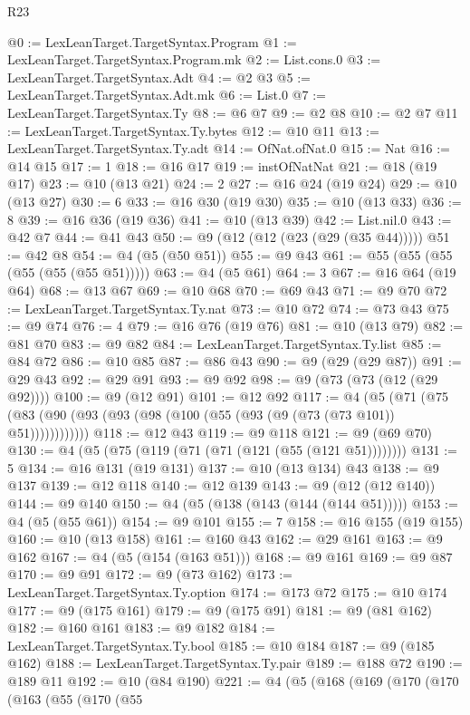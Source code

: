 \begin{lexlean}{R23}
\begin{coremodule}
@0 := LexLeanTarget.TargetSyntax.Program
@1 := LexLeanTarget.TargetSyntax.Program.mk
@2 := List.cons.{0}
@3 := LexLeanTarget.TargetSyntax.Adt
@4 := @2 @3
@5 := LexLeanTarget.TargetSyntax.Adt.mk
@6 := List.{0}
@7 := LexLeanTarget.TargetSyntax.Ty
@8 := @6 @7
@9 := @2 @8
@10 := @2 @7
@11 := LexLeanTarget.TargetSyntax.Ty.bytes
@12 := @10 @11
@13 := LexLeanTarget.TargetSyntax.Ty.adt
@14 := OfNat.ofNat.{0}
@15 := Nat
@16 := @14 @15
@17 := 1
@18 := @16 @17
@19 := instOfNatNat
@21 := @18 (@19 @17)
@23 := @10 (@13 @21)
@24 := 2
@27 := @16 @24 (@19 @24)
@29 := @10 (@13 @27)
@30 := 6
@33 := @16 @30 (@19 @30)
@35 := @10 (@13 @33)
@36 := 8
@39 := @16 @36 (@19 @36)
@41 := @10 (@13 @39)
@42 := List.nil.{0}
@43 := @42 @7
@44 := @41 @43
@50 := @9 (@12 (@12 (@23 (@29 (@35 @44)))))
@51 := @42 @8
@54 := @4 (@5 (@50 @51))
@55 := @9 @43
@61 := @55 (@55 (@55 (@55 (@55 (@55 @51)))))
@63 := @4 (@5 @61)
@64 := 3
@67 := @16 @64 (@19 @64)
@68 := @13 @67
@69 := @10 @68
@70 := @69 @43
@71 := @9 @70
@72 := LexLeanTarget.TargetSyntax.Ty.nat
@73 := @10 @72
@74 := @73 @43
@75 := @9 @74
@76 := 4
@79 := @16 @76 (@19 @76)
@81 := @10 (@13 @79)
@82 := @81 @70
@83 := @9 @82
@84 := LexLeanTarget.TargetSyntax.Ty.list
@85 := @84 @72
@86 := @10 @85
@87 := @86 @43
@90 := @9 (@29 (@29 @87))
@91 := @29 @43
@92 := @29 @91
@93 := @9 @92
@98 := @9 (@73 (@73 (@12 (@29 @92))))
@100 := @9 (@12 @91)
@101 := @12 @92
@117 := @4
    (@5 (@71 (@75 (@83 (@90 (@93 (@93 (@98 (@100 (@55 (@93 (@9 (@73 (@73 @101)) @51))))))))))))
@118 := @12 @43
@119 := @9 @118
@121 := @9 (@69 @70)
@130 := @4 (@5 (@75 (@119 (@71 (@71 (@121 (@55 (@121 @51))))))))
@131 := 5
@134 := @16 @131 (@19 @131)
@137 := @10 (@13 @134) @43
@138 := @9 @137
@139 := @12 @118
@140 := @12 @139
@143 := @9 (@12 (@12 @140))
@144 := @9 @140
@150 := @4 (@5 (@138 (@143 (@144 (@144 @51)))))
@153 := @4 (@5 (@55 @61))
@154 := @9 @101
@155 := 7
@158 := @16 @155 (@19 @155)
@160 := @10 (@13 @158)
@161 := @160 @43
@162 := @29 @161
@163 := @9 @162
@167 := @4 (@5 (@154 (@163 @51)))
@168 := @9 @161
@169 := @9 @87
@170 := @9 @91
@172 := @9 (@73 @162)
@173 := LexLeanTarget.TargetSyntax.Ty.option
@174 := @173 @72
@175 := @10 @174
@177 := @9 (@175 @161)
@179 := @9 (@175 @91)
@181 := @9 (@81 @162)
@182 := @160 @161
@183 := @9 @182
@184 := LexLeanTarget.TargetSyntax.Ty.bool
@185 := @10 @184
@187 := @9 (@185 @162)
@188 := LexLeanTarget.TargetSyntax.Ty.pair
@189 := @188 @72
@190 := @189 @11
@192 := @10 (@84 @190)
@221 := @4
    (@5
      (@168
        (@169
          (@170
            (@170
              (@163
                (@55
                  (@170
                    (@55

\end{coremodule}
\end{lexlean}
